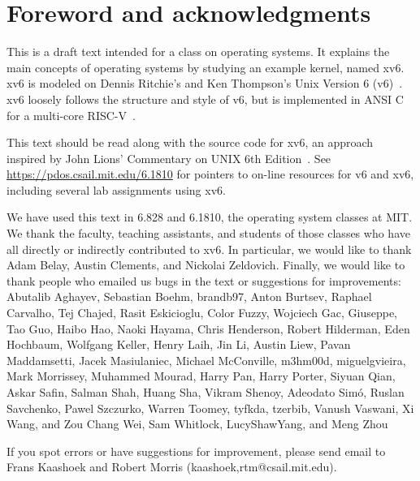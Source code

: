 \chapter*{Foreword and acknowledgments}


This is a draft text intended for a class on operating systems. It
explains the main concepts of operating systems by studying an example
kernel, named xv6.  xv6 is modeled on Dennis Ritchie's and
Ken Thompson's Unix Version 6 (v6)~\cite{unix}.  xv6 loosely follows the structure
and style of v6, but is implemented in ANSI C~\cite{kernighan} for 
a multi-core RISC-V~\cite{riscv}.

This text should be read along with the source code for xv6, an approach 
inspired by John Lions' Commentary on UNIX 6th Edition~\cite{lions}. See
\url{https://pdos.csail.mit.edu/6.1810} for pointers to on-line
resources for v6 and xv6, including several lab assignments
using xv6.

We have used this text in 6.828 and 6.1810, the operating system
classes at MIT.  We thank the faculty, teaching assistants, and
students of those classes who have all directly or indirectly
contributed to xv6.  In particular, we would like to thank Adam Belay,
Austin Clements, and Nickolai Zeldovich.  Finally, we would like to
thank people who emailed us bugs in the text or suggestions for
improvements: Abutalib Aghayev, Sebastian Boehm, brandb97, Anton
Burtsev, Raphael Carvalho, Tej Chajed, Rasit Eskicioglu, Color Fuzzy,
Wojciech Gac, Giuseppe, Tao Guo, Haibo Hao, Naoki Hayama, Chris
Henderson, Robert Hilderman, Eden Hochbaum, Wolfgang Keller, Henry
Laih, Jin Li, Austin Liew, Pavan Maddamsetti, Jacek Masiulaniec,
Michael McConville, m3hm00d, miguelgvieira, Mark Morrissey, Muhammed
Mourad, Harry Pan, Harry Porter, Siyuan Qian, Askar Safin, Salman
Shah, Huang Sha, Vikram Shenoy,  Adeodato Simó, Ruslan Savchenko, Pawel Szczurko,
Warren Toomey, tyfkda, tzerbib, Vanush Vaswani, Xi Wang, and Zou Chang
Wei, Sam Whitlock, LucyShawYang, and Meng Zhou

If you spot errors or have suggestions for improvement, please send email to
Frans Kaashoek and Robert Morris (kaashoek,rtm@csail.mit.edu).
